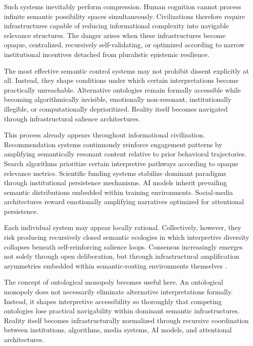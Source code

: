 \documentclass[11pt,a4paper]{article}
\begin{document}
Such systems inevitably perform compression. Human cognition cannot process infinite semantic possibility spaces simultaneously. Civilizations therefore require infrastructures capable of reducing informational complexity into navigable relevance structures. The danger arises when these infrastructures become opaque, centralized, recursively self-validating, or optimized according to narrow institutional incentives detached from pluralistic epistemic resilience.

The most effective semantic control systems may not prohibit dissent explicitly at all. Instead, they shape conditions under which certain interpretations become practically unreachable. Alternative ontologies remain formally accessible while becoming algorithmically invisible, emotionally non-resonant, institutionally illegible, or computationally deprioritized. Reality itself becomes navigated through infrastructural salience architectures.

This process already appears throughout informational civilization. Recommendation systems continuously reinforce engagement patterns by amplifying semantically resonant content relative to prior behavioral trajectories. Search algorithms prioritize certain interpretive pathways according to opaque relevance metrics. Scientific funding systems stabilize dominant paradigms through institutional persistence mechanisms. AI models inherit prevailing semantic distributions embedded within training environments. Social-media architectures reward emotionally amplifying narratives optimized for attentional persistence.

Each individual system may appear locally rational. Collectively, however, they risk producing recursively closed semantic ecologies in which interpretive diversity collapses beneath self-reinforcing salience loops. Consensus increasingly emerges not solely through open deliberation, but through infrastructural amplification asymmetries embedded within semantic-routing environments themselves \cite{zuboff2019}.

The concept of ontological monopoly becomes useful here. An ontological monopoly does not necessarily eliminate alternative interpretations formally. Instead, it shapes interpretive accessibility so thoroughly that competing ontologies lose practical navigability within dominant semantic infrastructures. Reality itself becomes infrastructurally normalized through recursive coordination between institutions, algorithms, media systems, AI models, and attentional architectures.
\end{document}
